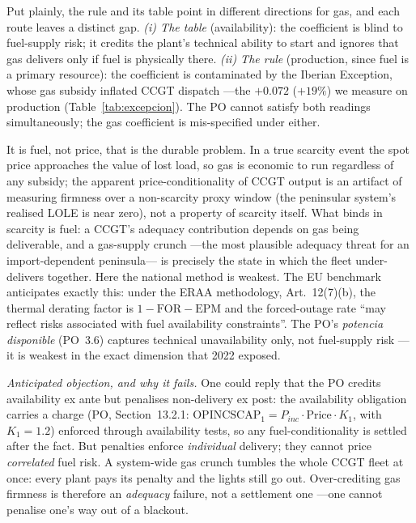 \documentclass[11pt,a4paper]{article}
\begin{document}
Put plainly, the rule and its table point in different directions for gas, and each
route leaves a distinct gap. \emph{(i) The table} (availability): the coefficient is
blind to fuel-supply risk; it credits the plant's technical ability to start and
ignores that gas delivers only if fuel is physically there. \emph{(ii) The rule}
(production, since fuel is a primary resource): the coefficient is contaminated by the
Iberian Exception, whose gas subsidy inflated CCGT dispatch ---the $+0.072$ ($+19\%$) we
measure on production
(Table~\ref{tab:excepcion}). The PO cannot satisfy both readings simultaneously; the
gas coefficient is mis-specified under either.

It is fuel, not price, that is the durable problem. In a true scarcity event the spot
price approaches the value of lost load, so gas is economic to run regardless of any
subsidy; the apparent price-conditionality of CCGT output is an artifact of measuring
firmness over a non-scarcity proxy window (the peninsular system's realised LOLE is
near zero), not a property of scarcity itself. What binds in scarcity is fuel: a CCGT's
adequacy contribution depends on gas being deliverable, and a gas-supply crunch ---the
most plausible adequacy threat for an import-dependent peninsula--- is precisely the
state in which the fleet under-delivers together. Here the national method is weakest.
The EU benchmark anticipates exactly this: under the ERAA methodology, Art.~12(7)(b),
the thermal derating factor is $1-\text{FOR}-\text{EPM}$ and the forced-outage rate
``may reflect risks associated with fuel availability constraints''. The PO's
\emph{potencia disponible} (PO~3.6) captures technical unavailability only, not
fuel-supply risk ---it is weakest in the exact dimension that 2022 exposed.

\emph{Anticipated objection, and why it fails.} One could reply that the PO credits
availability ex ante but penalises non-delivery ex post: the availability obligation
carries a charge (PO, Section~13.2.1: $\text{OPINCSCAP}_1 = P_{inc}\cdot \text{Price}
\cdot K_1$, with $K_1=1.2$) enforced through availability tests, so any
fuel-conditionality is settled after the fact. But penalties enforce \emph{individual}
delivery; they cannot price \emph{correlated} fuel risk. A system-wide gas crunch
tumbles the whole CCGT fleet at once: every plant pays its penalty and the lights still
go out. Over-crediting gas firmness is therefore an \emph{adequacy} failure, not a
settlement one ---one cannot penalise one's way out of a blackout.
\end{document}
